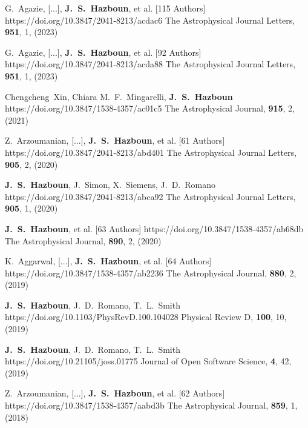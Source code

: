          {G.~{Agazie}, [...], \textbf{J.~S.~{Hazboun}}, et al. [115 Authors]}
         {https://doi.org/10.3847/2041-8213/acdac6}
         {{The Astrophysical Journal Letters}, \textbf{951}, 1, (2023)}

         {G.~{Agazie}, [...], \textbf{J.~S.~{Hazboun}}, et al. [92 Authors]}
         {https://doi.org/10.3847/2041-8213/acda88}
         {{The Astrophysical Journal Letters}, \textbf{951}, 1, (2023)}

         {Chengcheng~{Xin}, Chiara M.~F.~{Mingarelli}, \textbf{J.~S.~Hazboun}}
         {https://doi.org/10.3847/1538-4357/ac01c5}
         {{The Astrophysical Journal}, \textbf{915}, 2, (2021)}

         {Z.~{Arzoumanian}, [...], \textbf{J.~S.~{Hazboun}}, et al. [61 Authors]}
         {https://doi.org/10.3847/2041-8213/abd401}
         {{The Astrophysical Journal Letters}, \textbf{905}, 2, (2020)}

         {\textbf{J.~S.~Hazboun}, J.~{Simon}, X.~{Siemens}, J.~D.~{Romano}}
         {https://doi.org/10.3847/2041-8213/abca92}
         {{The Astrophysical Journal Letters}, \textbf{905}, 1, (2020)}

         {\textbf{J.~S.~{Hazboun}}, et al. [63 Authors]}
         {https://doi.org/10.3847/1538-4357/ab68db}
         {{The Astrophysical Journal}, \textbf{890}, 2, (2020)}

         {K.~{Aggarwal}, [...], \textbf{J.~S.~{Hazboun}}, et al. [64 Authors]}
         {https://doi.org/10.3847/1538-4357/ab2236}
         {{The Astrophysical Journal}, \textbf{880}, 2, (2019)}

         {\textbf{J.~S.~Hazboun}, J.~D.~{Romano}, T.~L.~{Smith}}
         {https://doi.org/10.1103/PhysRevD.100.104028}
         {{Physical Review D}, \textbf{100}, 10, (2019)}

         {\textbf{J.~S.~Hazboun}, J.~D.~{Romano}, T.~L.~{Smith}}
         {https://doi.org/10.21105/joss.01775}
         {{Journal of Open Software Science}, \textbf{4}, 42, (2019)}

         {Z.~{Arzoumanian}, [...], \textbf{J.~S.~{Hazboun}}, et al. [62 Authors]}
         {https://doi.org/10.3847/1538-4357/aabd3b}
         {{The Astrophysical Journal}, \textbf{859}, 1, (2018)}

